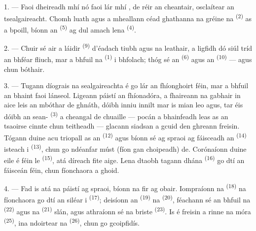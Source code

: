 \VUsaut{6.0mm}
\VUsaut{3.6mm}

\VUsaut{1.4mm}
\VUsaut{4.0mm}

1. --- Faoi dheireadh mhí  nó faoi lár mhí ,
de réir an cheantair, osclaítear an tsealgaireacht. Chomh luath agus a mheallann
céad ghathanna na gréine na  \textsuperscript{(2)} as a
bpoill, bíonn an  \textsuperscript{(5)} ag dul amach lena
 \textsuperscript{(4)}.

2. --- Chuir sé air a  láidir \textsuperscript{(9)}
d'éadach tiubh agus na  leathair, a ligfidh dó siúl tríd an
bhféar fliuch, mar a bhfuil na  \textsuperscript{(1)} i bhfolach;
thóg sé an  \textsuperscript{(6)} agus an 
\textsuperscript{(10)} --- agus chun bóthair.

3. --- Tugann díograis na sealgaireachta é go lár an fhíonghoirt féin, mar a bhfuil
an bhaint faoi lánseol. Ligeann páistí an fhíonadóra, a fhaireann na gabhair in
aice leis an mbóthar de ghnáth, dóibh inniu innilt mar is mian leo agus, tar éis
dóibh an sean- \textsuperscript{(3)} a cheangal de chuaille --- pocán
a bhainfeadh leas as an tsaoirse cinnte chun teitheadh --- glacann siadsan a gcuid
den ghreann freisin. Tógann duine acu triopall as an 
\textsuperscript{(12)} agus bíonn sé ag spraoi ag fáisceadh an 
\textsuperscript{(14)} isteach i  \textsuperscript{(13)}, chun go
ndéanfar múst (fíon gan choipeadh) de. Corónaíonn duine eile é féin le
 \textsuperscript{(15)}, atá díreach fite aige. Lena
dtaobh tagann  dhána \textsuperscript{(16)} go dtí an fáisceán
féin, chun fíonchaora a ghoid.

4. --- Fad is atá na páistí ag spraoi, bíonn na fir ag obair. Iompraíonn na
 \textsuperscript{(18)} na fíonchaora go dtí an siléar i
 \textsuperscript{(17)}; deisíonn an 
\textsuperscript{(19)} na  \textsuperscript{(20)}, féachann sé an
bhfuil na  \textsuperscript{(22)} agus na 
\textsuperscript{(21)} slán, agus athraíonn sé na  briste
\textsuperscript{(23)}. Is é freisin a rinne na  móra
\textsuperscript{(25)}, ina ndoirtear na 
\textsuperscript{(26)}, chun go gcoipfidís.

